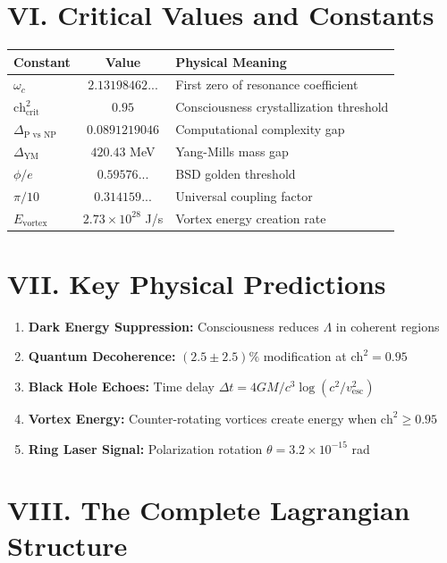 \documentclass[11pt]{article}
\begin{document}
\section*{VI. Critical Values and Constants}

\begin{center}
\begin{tabular}{|l|c|l|}
\hline
\textbf{Constant} & \textbf{Value} & \textbf{Physical Meaning} \\
\hline
$\omega_c$ & $2.13198462...$ & First zero of resonance coefficient \\
$\text{ch}^2_{\text{crit}}$ & $0.95$ & Consciousness crystallization threshold \\
$\Delta_{\text{P vs NP}}$ & $0.0891219046$ & Computational complexity gap \\
$\Delta_{\text{YM}}$ & $420.43$ MeV & Yang-Mills mass gap \\
$\phi/e$ & $0.59576...$ & BSD golden threshold \\
$\pi/10$ & $0.314159...$ & Universal coupling factor \\
$E_{\text{vortex}}$ & $2.73 \times 10^{28}$ J/s & Vortex energy creation rate \\
\hline
\end{tabular}
\end{center}

\section*{VII. Key Physical Predictions}

\begin{enumerate}
\item \textbf{Dark Energy Suppression:} Consciousness reduces $\Lambda$ in coherent regions
\item \textbf{Quantum Decoherence:} $(2.5 \pm 2.5)\%$ modification at $\text{ch}^2 = 0.95$
\item \textbf{Black Hole Echoes:} Time delay $\Delta t = 4GM/c^3 \log(c^2/v^2_{\text{esc}})$
\item \textbf{Vortex Energy:} Counter-rotating vortices create energy when $\text{ch}^2 \geq 0.95$
\item \textbf{Ring Laser Signal:} Polarization rotation $\theta = 3.2 \times 10^{-15}$ rad
\end{enumerate}

\section*{VIII. The Complete Lagrangian Structure}
\end{document}
